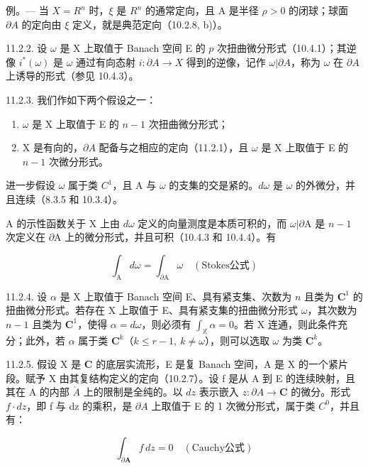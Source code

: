例。--- 当 \(X = R^{n}\) 时，\(\xi\) 是 \(R^{n}\) 的通常定向，且 A 是半径 \(\rho>0\) 的闭球；球面 \(\partial A\) 的定向由 \(\xi\) 定义，就是典范定向（10.2.8, b)）。

11.2.2. 设 \(\omega\) 是 X 上取值于 Banach 空间 E 的 \(p\) 次扭曲微分形式（10.4.1）；其逆像 \(i^{*}(\omega)\) 是 \(\omega\) 通过有向态射 \(i\colon\partial A\to X\) 得到的逆像，记作 \(\omega|\partial A\)，称为 \(\omega\) 在 \(\partial A\) 上诱导的形式（参见 10.4.3）。

11.2.3. 我们作如下两个假设之一：

\begin{enumerate}
\def\labelenumi{(\roman{enumi})}
\tightlist
\item
  \(\omega\) 是 X 上取值于 E 的 \(n - 1\) 次扭曲微分形式；
\item
  X 是有向的，\(\partial A\) 配备与之相应的定向（11.2.1），且 \(\omega\) 是 X 上取值于 E 的 \(n - 1\) 次微分形式。
\end{enumerate}

进一步假设 \(\omega\) 属于类 \(C^{1}\)，且 A 与 \(\omega\) 的支集的交是紧的。\(d\omega\) 是 \(\omega\) 的外微分，并且连续（8.3.5 和 10.3.4）。

A 的示性函数关于 X 上由 \(d\omega\) 定义的向量测度是本质可积的，而 \(\omega|\partial\mathrm{A}\) 是 \(n-1\) 次定义在 \(\partial\mathrm{A}\) 上的微分形式，并且可积（10.4.3 和 10.4.4）。有

\[
\int_ {\mathrm{A}} d \omega = \int_ {\partial \mathrm{A}} \omega \quad (\text{Stokes公式})
\]

11.2.4. 设 \(\alpha\) 是 X 上取值于 Banach 空间 E、具有紧支集、次数为 \(n\) 且类为 \(\mathbf{C}^1\) 的扭曲微分形式。若存在 X 上取值于 E、具有紧支集的扭曲微分形式 \(\omega\)，其次数为 \(n - 1\) 且类为 \(\mathbf{C}^1\)，使得 \(\alpha = d\omega\)，则必须有 \(\int_{\mathbb{X}} \alpha = 0\)。若 X 连通，则此条件充分；此外，若 \(\alpha\) 属于类 \(\mathbf{C}^k\)（\(k\leqslant r-1,\ k\neq\omega\)），则可以选取 \(\omega\) 为类 \(\mathbf{C}^k\)。

11.2.5. 假设 X 是 \(\mathbf{C}\) 的底层实流形，E 是复 Banach 空间，A 是 X 的一个紧片段。赋予 X 由其复结构定义的定向（10.2.7）。设 f 是从 A 到 E 的连续映射，且其在 A 的内部 \(\mathring{A}\) 上的限制是全纯的。以 \(dz\) 表示嵌入 \(z\colon\partial A\to\mathbf{C}\) 的微分。形式 \(f\cdot dz\)，即 f 与 dz 的乘积，是 \(\partial A\) 上取值于 E 的 1 次微分形式，属于类 \(C^{0}\)，并且有：

\[
\int_ {\partial \mathbf {A}} f\, d z = 0 \quad (\text{Cauchy公式})
\]

